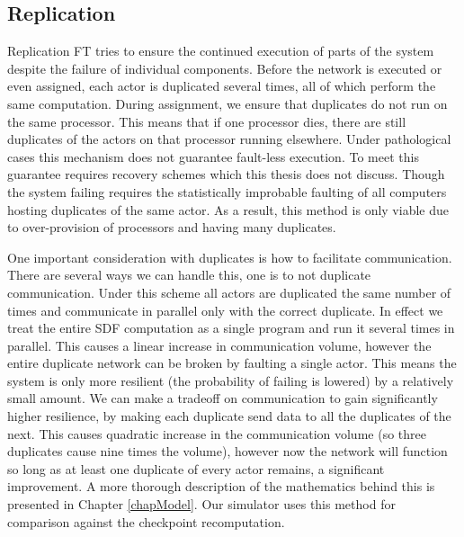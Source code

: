 \subsection{Replication}

Replication FT tries to ensure the continued execution of parts of the system despite the failure of individual components.
Before the network is executed or even assigned, each actor is duplicated several times, all of which perform the same computation.
During assignment, we ensure that duplicates do not run on the same processor.
This means that if one processor dies, there are still duplicates of the actors on that processor running elsewhere.
Under pathological cases this mechanism does not guarantee fault-less execution.
To meet this guarantee requires recovery schemes which this thesis does not discuss.
Though the system failing requires the statistically improbable faulting of all computers hosting duplicates of the same actor.
As a result, this method is only viable due to over-provision of processors and having many duplicates.

One important consideration with duplicates is how to facilitate communication.
There are several ways we can handle this, one is to not duplicate communication.
Under this scheme all actors are duplicated the same number of times and communicate in parallel only with the correct duplicate.
In effect we treat the entire SDF computation as a single program and run it several times in parallel.
This causes a linear increase in communication volume, however the entire duplicate network can be broken by faulting a single actor.
This means the system is only more resilient (the probability of failing is lowered) by a relatively small amount.
We can make a tradeoff on communication to gain significantly higher resilience, by making each duplicate send data to all the duplicates of the next.
This causes quadratic increase in the communication volume (so three duplicates cause nine times the volume), however now the network will function so long as at least one duplicate of every actor remains, a significant improvement.
A more thorough description of the mathematics behind this is presented in Chapter \ref{chapModel}.
Our simulator uses this method for comparison against the checkpoint recomputation.

